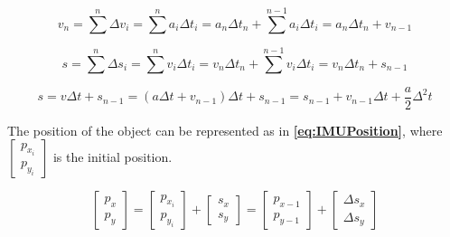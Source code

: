 \begin{equation} \label{eq:EulerAcceleration}
    v_n = \sum^{n} \Delta v_i = \sum^{n} a_i \Delta t_i = a_n \Delta t_n + \sum^{n - 1} a_i \Delta t_i = a_n \Delta t_n + v_{n - 1}
\end{equation}

\begin{equation} \label{eq:EulerDisplacement}
    s = \sum^{n} \Delta s_i = \sum^{n} v_i \Delta t_i = v_n \Delta t_n + \sum^{n - 1} v_i \Delta t_i = v_n \Delta t_n + s_{n - 1}
\end{equation}

\begin{equation} \label{eq:TotalDisplacement}
    s = v \Delta t + s_{n - 1} = (a \Delta t + v_{n - 1}) \Delta t + s_{n - 1} = s_{n - 1} + v_{n - 1} \Delta t + \frac{a}{2} \Delta^2 t
\end{equation}

The position of the object can be represented as in \textbf{\autoref{eq:IMUPosition}}, where $\begin{bmatrix}p_{x_{i}} \\ p_{y_{i}}\end{bmatrix}$ is the initial position.

\begin{equation} \label{eq:IMUPosition}
    \begin{bmatrix}p_{x} \\ p_{y}\end{bmatrix} = \begin{bmatrix}p_{x_{i}} \\ p_{y_{i}}\end{bmatrix} + \begin{bmatrix}s_{x} \\ s_{y}\end{bmatrix} = \begin{bmatrix}p_{x - 1} \\ p_{y - 1}\end{bmatrix} + \begin{bmatrix}\Delta s_{x} \\ \Delta s_{y}\end{bmatrix}
\end{equation}